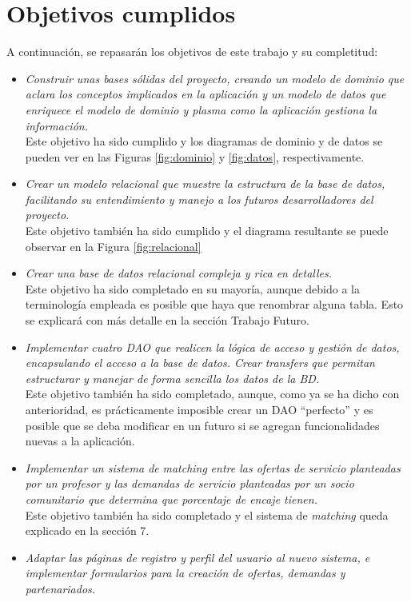 \documentclass[11pt]{book}
\begin{document}
	\section{Objetivos cumplidos}
	A continuación, se repasarán los objetivos de este trabajo y su completitud:
	\begin{itemize}
		\item \emph{Construir unas bases sólidas del proyecto, creando un modelo de dominio que aclara los conceptos implicados en la aplicación y un modelo de datos que enriquece el modelo de dominio y plasma como la aplicación gestiona la información.}\\
		Este objetivo ha sido cumplido y los diagramas de dominio y de datos se pueden ver en las Figuras \ref{fig:dominio} y \ref{fig:datos}, respectivamente.
		\item \emph{Crear un modelo relacional que muestre la estructura de la base de datos, facilitando su entendimiento y manejo a los futuros desarrolladores del proyecto.}\\
		Este objetivo también ha sido cumplido y el diagrama resultante se puede observar en la Figura \ref{fig:relacional}
		\item \emph{Crear una base de datos relacional compleja y rica en detalles.} \\
		Este objetivo ha sido completado en su mayoría, aunque debido a la terminología empleada es posible que haya que renombrar alguna tabla. Esto se explicará con más detalle en la sección Trabajo Futuro.
		\item \emph{Implementar cuatro DAO que realicen la lógica de acceso y gestión de datos, encapsulando el acceso a la base de datos. Crear }\emph{transfers} \emph{que permitan estructurar y manejar de forma sencilla los datos de la BD.} \\
		Este objetivo también ha sido completado, aunque, como ya se ha dicho con anterioridad, es prácticamente imposible crear un DAO ``perfecto'' y es posible que se deba modificar en un futuro si se agregan funcionalidades nuevas a la aplicación.
		\item \emph{Implementar un sistema de} \emph{matching} \emph{entre las ofertas de servicio planteadas por un profesor y las demandas de servicio planteadas por un socio comunitario que determina que porcentaje de encaje tienen.} \\
		Este objetivo también ha sido completado y el sistema de \emph{matching} queda explicado en la sección 7.
		\item \emph{Adaptar las páginas de registro y perfil del usuario al nuevo sistema, e implementar formularios para la creación de ofertas, demandas y partenariados.} \\

\end{itemize}
\end{document}
